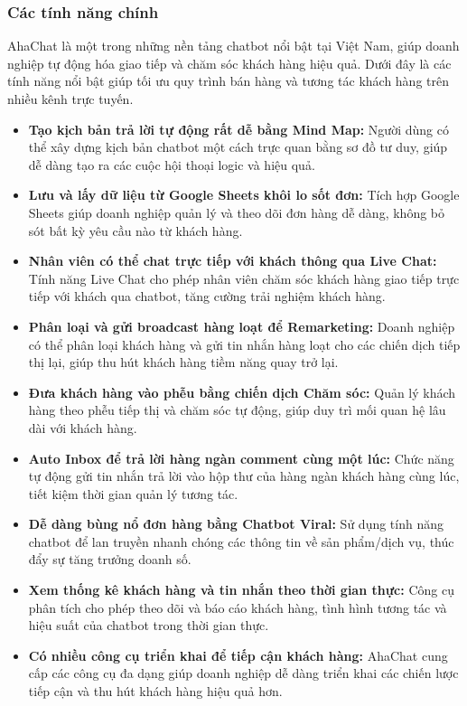 \subsubsection{Các tính năng chính}
AhaChat là một trong những nền tảng chatbot nổi bật tại Việt Nam, giúp doanh nghiệp tự động hóa giao tiếp và chăm sóc khách hàng hiệu quả. Dưới đây là các tính năng nổi bật giúp tối ưu quy trình bán hàng và tương tác khách hàng trên nhiều kênh trực tuyến.
\begin{itemize}
    \item \textbf{Tạo kịch bản trả lời tự động rất dễ bằng Mind Map:} Người dùng có thể xây dựng kịch bản chatbot một cách trực quan bằng sơ đồ tư duy, giúp dễ dàng tạo ra các cuộc hội thoại logic và hiệu quả.


\item \textbf{Lưu và lấy dữ liệu từ Google Sheets khôi lo sốt đơn:} Tích hợp Google Sheets giúp doanh nghiệp quản lý và theo dõi đơn hàng dễ dàng, không bỏ sót bất kỳ yêu cầu nào từ khách hàng.

\item \textbf{Nhân viên có thể chat trực tiếp với khách thông qua Live Chat:} Tính năng Live Chat cho phép nhân viên chăm sóc khách hàng giao tiếp trực tiếp với khách qua chatbot, tăng cường trải nghiệm khách hàng.

\item \textbf{Phân loại và gửi broadcast hàng loạt để Remarketing:} Doanh nghiệp có thể phân loại khách hàng và gửi tin nhắn hàng loạt cho các chiến dịch tiếp thị lại, giúp thu hút khách hàng tiềm năng quay trở lại.

\item \textbf{Đưa khách hàng vào phễu bằng chiến dịch Chăm sóc:} Quản lý khách hàng theo phễu tiếp thị và chăm sóc tự động, giúp duy trì mối quan hệ lâu dài với khách hàng.

\item \textbf{Auto Inbox để trả lời hàng ngàn comment cùng một lúc:} Chức năng tự động gửi tin nhắn trả lời vào hộp thư của hàng ngàn khách hàng cùng lúc, tiết kiệm thời gian quản lý tương tác.

\item \textbf{Dễ dàng bùng nổ đơn hàng bằng Chatbot Viral:} Sử dụng tính năng chatbot để lan truyền nhanh chóng các thông tin về sản phẩm/dịch vụ, thúc đẩy sự tăng trưởng doanh số.

\item \textbf{Xem thống kê khách hàng và tin nhắn theo thời gian thực:} Công cụ phân tích cho phép theo dõi và báo cáo khách hàng, tình hình tương tác và hiệu suất của chatbot trong thời gian thực.

\item \textbf{Có nhiều công cụ triển khai để tiếp cận khách hàng:} AhaChat cung cấp các công cụ đa dạng giúp doanh nghiệp dễ dàng triển khai các chiến lược tiếp cận và thu hút khách hàng hiệu quả hơn.
\end{itemize}
